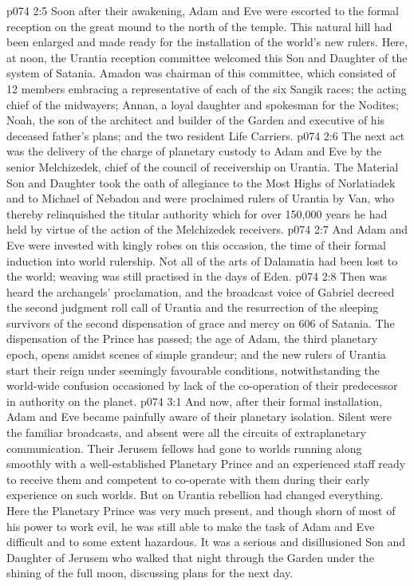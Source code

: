 \vs p074 2:5 \pc Soon after their awakening, Adam and Eve were escorted to the formal reception on the great mound to the north of the temple. This natural hill had been enlarged and made ready for the installation of the world’s new rulers. Here, at noon, the Urantia reception committee welcomed this Son and Daughter of the system of Satania. Amadon was chairman of this committee, which consisted of 12 members embracing a representative of each of the six Sangik races; the acting chief of the midwayers; Annan, a loyal daughter and spokesman for the Nodites; Noah, the son of the architect and builder of the Garden and executive of his deceased father’s plans; and the two resident Life Carriers.
\vs p074 2:6 The next act was the delivery of the charge of planetary custody to Adam and Eve by the senior Melchizedek, chief of the council of receivership on Urantia. The Material Son and Daughter took the oath of allegiance to the Most Highs of Norlatiadek and to Michael of Nebadon and were proclaimed rulers of Urantia by Van, who thereby relinquished the titular authority which for over 150,000 years he had held by virtue of the action of the Melchizedek receivers.
\vs p074 2:7 And Adam and Eve were invested with kingly robes on this occasion, the time of their formal induction into world rulership. Not all of the arts of Dalamatia had been lost to the world; weaving was still practised in the days of Eden.
\vs p074 2:8 Then was heard the archangels’ proclamation, and the broadcast voice of Gabriel decreed the second judgment roll call of Urantia and the resurrection of the sleeping survivors of the second dispensation of grace and mercy on 606 of Satania. The dispensation of the Prince has passed; the age of Adam, the third planetary epoch, opens amidst scenes of simple grandeur; and the new rulers of Urantia start their reign under seemingly favourable conditions, notwithstanding the world\hyp{}wide confusion occasioned by lack of the co\hyp{}operation of their predecessor in authority on the planet.
\vs p074 3:1 And now, after their formal installation, Adam and Eve became painfully aware of their planetary isolation. Silent were the familiar broadcasts, and absent were all the circuits of extraplanetary communication. Their Jerusem fellows had gone to worlds running along smoothly with a well\hyp{}established Planetary Prince and an experienced staff ready to receive them and competent to co\hyp{}operate with them during their early experience on such worlds. But on Urantia rebellion had changed everything. Here the Planetary Prince was very much present, and though shorn of most of his power to work evil, he was still able to make the task of Adam and Eve difficult and to some extent hazardous. It was a serious and disillusioned Son and Daughter of Jerusem who walked that night through the Garden under the shining of the full moon, discussing plans for the next day.
